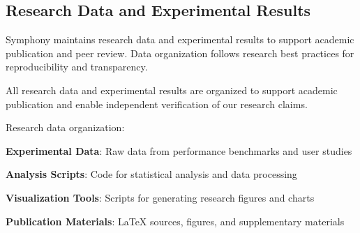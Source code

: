 \subsection*{Research Data and Experimental Results}

Symphony maintains research data and experimental results to support academic publication and peer review. Data organization follows research best practices for reproducibility and transparency.

\begin{successbox}
All research data and experimental results are organized to support academic publication and enable independent verification of our research claims.
\end{successbox}

Research data organization:
\begin{expandedlist}
    \item \textbf{Experimental Data}: Raw data from performance benchmarks and user studies
    \item \textbf{Analysis Scripts}: Code for statistical analysis and data processing
    \item \textbf{Visualization Tools}: Scripts for generating research figures and charts
    \item \textbf{Publication Materials}: LaTeX sources, figures, and supplementary materials
\end{expandedlist}
